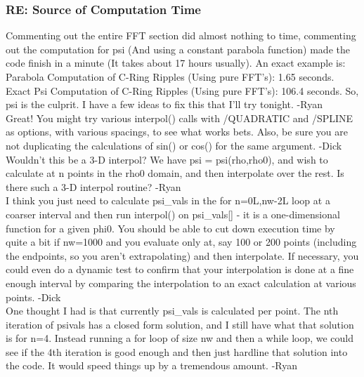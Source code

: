 \documentclass[crop=false,class=article,oneside]{standalone}
\begin{document}
\subsubsection{\footnotesize RE: Source of Computation Time}
Commenting out the entire FFT section did almost nothing to time, commenting out the computation for psi (And using a constant parabola function) made the code finish in a minute (It takes about 17 hours usually). An exact example is: Parabola Computation of C-Ring Ripples (Using pure FFT's): 1.65 seconds. Exact Psi Computation of C-Ring Ripples (Using pure FFT's): 106.4 seconds. So, psi is the culprit. I have a few ideas to fix this that I'll try tonight. -Ryan\\
Great! You might try various interpol() calls with /QUADRATIC and /SPLINE as options, with various spacings, to see what works bets. Also, be sure you are not duplicating the calculations of sin() or cos() for the same argument. -Dick\\
Wouldn't this be a 3-D interpol? We have psi = psi(rho,rho0), and wish to calculate at n points in the rho0 domain, and then interpolate over the rest. Is there such a 3-D interpol routine? -Ryan\\
I think you just need to calculate psi\_vals in the for n=0L,nw-2L loop at a coarser interval and then run interpol() on psi\_vals[] - it is a one-dimensional function for a given phi0. You should be able to cut down execution time by quite a bit if nw=1000 and you evaluate only at, say 100 or 200 points (including the endpoints, so you aren't extrapolating) and then interpolate. If necessary, you could even do a dynamic test to confirm that your interpolation is done at a fine enough interval by comparing the interpolation to an exact calculation at various points. -Dick\\
One thought I had is that currently psi\_vals is calculated per point. The nth iteration of psivals has a closed form solution, and I still have what that solution is for n=4. Instead running a for loop of size nw and then a while loop, we could see if the 4th iteration is good enough and then just hardline that solution into the code. It would speed things up by a tremendous amount. -Ryan\\
\end{document}
